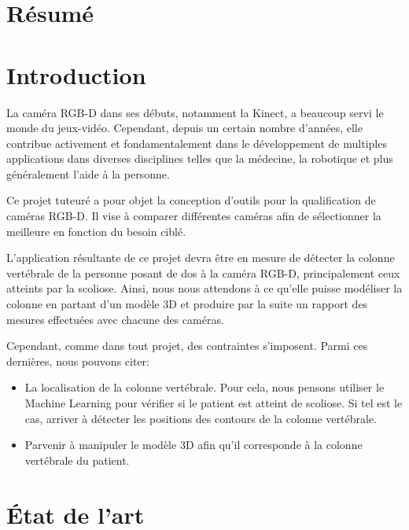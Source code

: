 \documentclass[a4paper, 12pt]{book}
\newcounter{program}[subsection]
\begin{document}
\chapter*{Résumé}


\tableofcontents
\listoffigures
\mainmatter
\chapter*{Introduction}
La caméra RGB-D dans ses débuts, notamment la Kinect, a beaucoup
servi le monde du jeux-vidéo. Cependant, depuis un certain nombre d'années, elle contribue activement et fondamentalement dans le développement
de multiples applications dans diverses disciplines telles que la médecine, la
robotique et plus généralement l'aide à la personne.
\par Ce projet tuteuré a pour objet la conception d'outils pour la qualification de caméras RGB-D. Il vise à comparer différentes caméras afin de sélectionner la meilleure en
fonction du besoin ciblé.
\par L'application résultante de ce projet devra être en mesure de détecter la colonne vertébrale de la personne posant de dos à la caméra RGB-D, principalement ceux atteints par la scoliose. Ainsi, nous nous attendons à ce qu'elle puisse modéliser la colonne en partant d'un modèle 3D et produire par la suite un rapport des mesures effectuées avec chacune des caméras. 
\par Cependant, comme dans tout projet, des contraintes s'imposent. Parmi ces dernières, nous pouvons citer:
\begin{itemize}
	\item La localisation de la colonne vertébrale. Pour cela, nous pensons utiliser le Machine Learning pour vérifier si le patient est atteint de scoliose. Si tel est le cas, arriver à détecter les positions des contours de la colonne vertébrale.
	\item Parvenir à manipuler le modèle 3D afin qu'il corresponde à la colonne vertébrale du patient.
\end{itemize}

\chapter{État de l'art}
\end{document}
